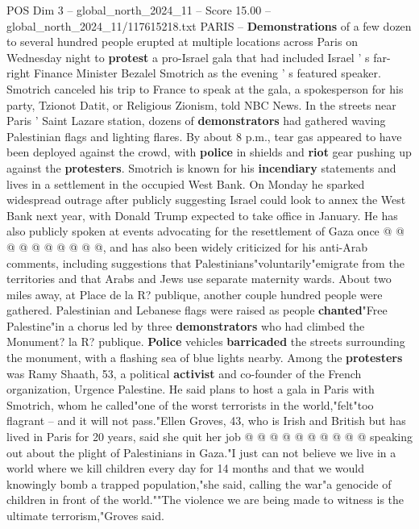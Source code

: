 \begin{textsample}{POS Dim 3 – global\_north\_2024\_11 – Score 15.00 – global\_north\_2024\_11/117615218.txt}  \label{ex:f3_pos_175}
PARIS -- \textbf{Demonstrations} of a few dozen to several hundred people erupted at multiple locations across Paris on Wednesday night to \textbf{protest} a pro-Israel gala that had included Israel ' s far-right Finance Minister Bezalel Smotrich as the evening ' s featured speaker.
Smotrich canceled his trip to France to speak at the gala, a spokesperson for his party, Tzionot Datit, or Religious Zionism, told NBC News.
In the streets near Paris ' Saint Lazare station, dozens of \textbf{demonstrators} had gathered waving Palestinian flags and lighting flares.
By about 8 p.m., tear gas appeared to have been deployed against the crowd, with \textbf{police} in shields and \textbf{riot} gear pushing up against the \textbf{protesters}.
Smotrich is known for his \textbf{incendiary} statements and lives in a settlement in the occupied West Bank.
On Monday he sparked widespread outrage after publicly suggesting Israel could look to annex the West Bank next year, with Donald Trump expected to take office in January.
He has also publicly spoken at events advocating for the resettlement of Gaza once @ @ @ @ @ @ @ @ @ @, and has also been widely criticized for his anti-Arab comments, including suggestions that Palestinians"voluntarily"emigrate from the territories and that Arabs and Jews use separate maternity wards.
About two miles away, at Place de la R? publique, another couple hundred people were gathered.
Palestinian and Lebanese flags were raised as people \textbf{chanted}"Free Palestine"in a chorus led by three \textbf{demonstrators} who had climbed the Monument? la R? publique. \textbf{Police} vehicles \textbf{barricaded} the streets surrounding the monument, with a flashing sea of blue lights nearby.
Among the \textbf{protesters} was Ramy Shaath, 53, a political \textbf{activist} and co-founder of the French organization, Urgence Palestine.
He said plans to host a gala in Paris with Smotrich, whom he called"one of the worst terrorists in the world,"felt"too flagrant -- and it will not pass."Ellen Groves, 43, who is Irish and British but has lived in Paris for 20 years, said she quit her job @ @ @ @ @ @ @ @ @ @ speaking out about the plight of Palestinians in Gaza."I just can not believe we live in a world where we kill children every day for 14 months and that we would knowingly bomb a trapped population,"she said, calling the war"a genocide of children in front of the world.""The violence we are being made to witness is the ultimate terrorism,"Groves said.

\end{textsample}
